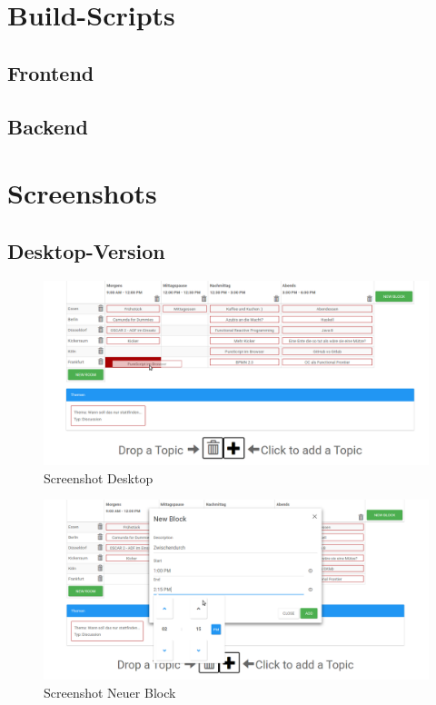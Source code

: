 \begin{appendices}
\section{Build-Scripts}
\subsection{Frontend}

\subsection{Backend}


\section{Screenshots}
\subsection{Desktop-Version}
\begin{figure}
    \centering
    \includegraphics[scale=0.5]{img/desktop_screenshot.png}
    \caption{Screenshot Desktop}
\end{figure}

\begin{figure}
    \centering
    \includegraphics[scale=0.5]{img/neuer_block_screenshot.png}
    \caption{Screenshot Neuer Block}
\end{figure}


\end{appendices}
